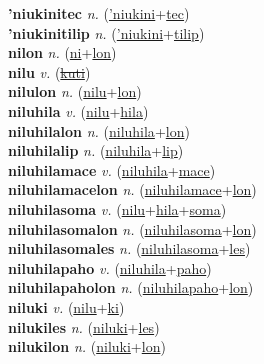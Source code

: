 \textbf{'niukinitec} \textit{n.} (\hyperref['niukini]{'niukini}+\hyperref[tec]{tec})
 \label{'niukinitec} \\
\textbf{'niukinitilip} \textit{n.} (\hyperref['niukini]{'niukini}+\hyperref[tilip]{tilip})
 \label{'niukinitilip} \\
\textbf{nilon} \textit{n.} (\hyperref[ni]{ni}+\hyperref[lon]{lon})
 \label{nilon} \\
\textbf{nilu} \textit{v.} (\hyperref[kuti]{\sout{kuti}})
 \label{nilu} \\
\textbf{nilulon} \textit{n.} (\hyperref[nilu]{nilu}+\hyperref[lon]{lon})
 \label{nilulon} \\
\textbf{niluhila} \textit{v.} (\hyperref[nilu]{nilu}+\hyperref[hila]{hila})
 \label{niluhila} \\
\textbf{niluhilalon} \textit{n.} (\hyperref[niluhila]{niluhila}+\hyperref[lon]{lon})
 \label{niluhilalon} \\
\textbf{niluhilalip} \textit{n.} (\hyperref[niluhila]{niluhila}+\hyperref[lip]{lip})
 \label{niluhilalip} \\
\textbf{niluhilamace} \textit{v.} (\hyperref[niluhila]{niluhila}+\hyperref[mace]{mace})
 \label{niluhilamace} \\
\textbf{niluhilamacelon} \textit{n.} (\hyperref[niluhilamace]{niluhilamace}+\hyperref[lon]{lon})
 \label{niluhilamacelon} \\
\textbf{niluhilasoma} \textit{v.} (\hyperref[nilu]{nilu}+\hyperref[hila]{hila}+\hyperref[soma]{soma})
 \label{niluhilasoma} \\
\textbf{niluhilasomalon} \textit{n.} (\hyperref[niluhilasoma]{niluhilasoma}+\hyperref[lon]{lon})
 \label{niluhilasomalon} \\
\textbf{niluhilasomales} \textit{n.} (\hyperref[niluhilasoma]{niluhilasoma}+\hyperref[les]{les})
 \label{niluhilasomales} \\
\textbf{niluhilapaho} \textit{v.} (\hyperref[niluhila]{niluhila}+\hyperref[paho]{paho})
 \label{niluhilapaho} \\
\textbf{niluhilapaholon} \textit{n.} (\hyperref[niluhilapaho]{niluhilapaho}+\hyperref[lon]{lon})
 \label{niluhilapaholon} \\
\textbf{niluki} \textit{v.} (\hyperref[nilu]{nilu}+\hyperref[ki]{ki})
 \label{niluki} \\
\textbf{nilukiles} \textit{n.} (\hyperref[niluki]{niluki}+\hyperref[les]{les})
 \label{nilukiles} \\
\textbf{nilukilon} \textit{n.} (\hyperref[niluki]{niluki}+\hyperref[lon]{lon})
 \label{nilukilon} \\
